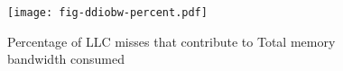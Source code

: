 \begin{figure}[t]
\texttt{[image: fig-ddiobw-percent.pdf]}
\caption{Percentage of LLC misses that contribute to Total memory bandwidth consumed}
\label{fig:ddiobw-percent}
\end{figure}
